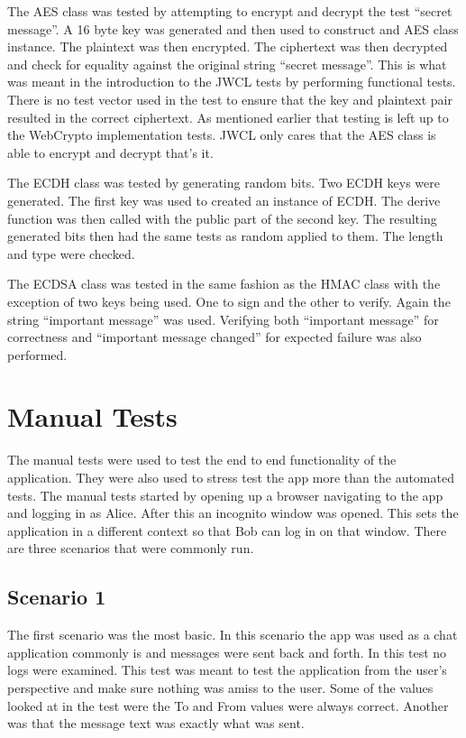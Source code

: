 The AES class was tested by attempting to encrypt and decrypt the test “secret message”. A 16 byte key was generated and then used to construct and AES class instance. The plaintext was then encrypted. The ciphertext was then decrypted and check for equality against the original string “secret message”. This is what was meant in the introduction to the JWCL tests by performing functional tests. There is no test vector used in the test to ensure that the key and plaintext pair resulted in the correct ciphertext. As mentioned earlier that testing is left up to the WebCrypto implementation tests. JWCL only cares that the AES class is able to encrypt and decrypt that's it.


The ECDH class was tested by generating random bits. Two ECDH keys were generated. The first key was used to created an instance of ECDH. The derive function was then called with the public part of the second key. The resulting generated bits then had the same tests as random applied to them. The length and type were checked.


The ECDSA class was tested in the same fashion as the HMAC class with the exception of two keys being used. One to sign and the other to verify. Again the string “important message” was used. Verifying both “important message” for correctness and “important message changed” for expected failure was also performed. 


\section{Manual Tests}


The manual tests were used to test the end to end functionality of the application. They were also used to stress test the app more than the automated tests. The manual tests started by opening up a browser navigating to the app and logging in as Alice. After this an incognito window was opened. This sets the application in a different context so that Bob can log in on that window. There are three scenarios that were commonly run.


\subsection{Scenario 1}


The first scenario was the most basic. In this scenario the app was used as a chat application commonly is and messages were sent back and forth. In this test no logs were examined. This test was meant to test the application from the user's perspective and make sure nothing was amiss to the user. Some of the values looked at in the test were the To and From values were always correct. Another was that the message text was exactly what was sent.


